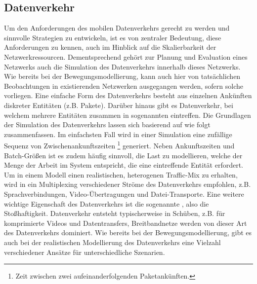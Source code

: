 \documentclass[12pt, a4paper]{article}
\begin{document}
\subsection{Datenverkehr}
\label{sec:traffic}

Um den Anforderungen des mobilen Datenverkehrs gerecht zu werden und sinnvolle Strategien zu entwickeln,
ist es von zentraler Bedeutung, diese Anforderungen zu kennen, auch im Hinblick auf die Skalierbarkeit der
Netzwerkressourcen. \cite{Oliveira2014} Dementsprechend gehört zur Planung und Evaluation eines Netzwerks 
auch die Simulation des Datenverkehrs innerhalb dieses Netzwerks. Wie bereits bei der Bewegungsmodellierung, 
kann auch hier von tatsächlichen Beobachtungen in existierenden Netzwerken ausgegangen werden, sofern solche vorliegen.\newline
Eine einfache Form des Datenverkehrs besteht aus einzelnen Ankünften diskreter Entitäten (z.B. Pakete).
Darüber hinaus gibt es Datenverkehr, bei welchem mehrere Entitäten zusammen in sogenannten  
eintreffen. \cite{Frost1994}
Die Grundlagen der Simulation des Datenverkehrs lassen sich basierend auf \cite{Frost1994} wie folgt zusammenfassen.
Im einfachsten Fall wird in einer Simulation eine zufällige Sequenz von Zwischenankunftszeiten \footnote{Zeit zwischen zwei 
aufeinanderfolgenden Paketankünften.} generiert. Neben Ankunftszeiten und Batch-Größen ist es zudem häufig sinnvoll,
die Last zu modellieren, welche der Menge der Arbeit im System entspricht, die eine eintreffende Entität erfordert.
Um in einem Modell einen realistischen, heterogenen Traffic-Mix zu erhalten, wird in \cite{Frost1994} ein Multiplexing
verschiedener Ströme des Datenverkehrs empfohlen, z.B. Sprachverbindungen, Video-Übertragungen und Datei-Transporte.
Eine weitere wichtige Eigenschaft des Datenverkehrs ist die sogenannte , also die Stoßhaftigkeit.
Datenverkehr entsteht typischerweise in Schüben, z.B. für komprimierte Videos und Datentransfers,
Breitbandnetze werden von dieser Art des Datenverkehrs dominiert. \cite{Frost1994}
Wie bereits bei der Bewegungsmodellierung, gibt es auch bei der realistischen Modellierung des Datenverkehrs
eine Vielzahl verschiedener Ansätze für unterschiedliche Szenarien.
\end{document}
